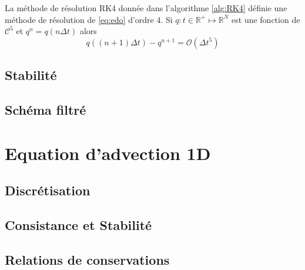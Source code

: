 \begin{theoreme}
La méthode de résolution RK4 donnée dans l'algorithme \ref{alg:RK4} définie une méthode de résolution de \ref{eq:edo} d'ordre 4. Si $q : t \in \mathbb{R}^+ \mapsto \mathbb{R}^N$ est une fonction de $\mathcal{C}^5$ et $q^n = q(n \Delta t)$ alors
\begin{equation}
q((n+1) \Delta t) - q^{n+1} = \mathcal{O} \left( \Delta t^5 \right)
\end{equation}

\end{theoreme}

\subsection{Stabilité}

\subsection{Schéma filtré}















\section{Equation d'advection 1D}

\subsection{Discrétisation}

\subsection{Consistance et Stabilité}

\subsection{Relations de conservations}